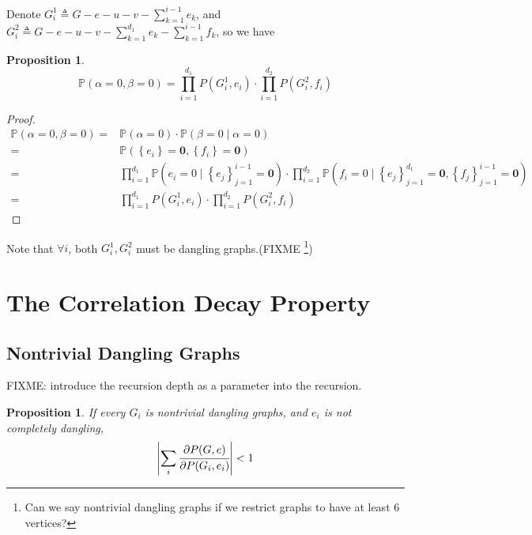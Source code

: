 \documentclass[a4paper]{article}
\newtheorem{Prop}[Thm]{Proposition}
\newcommand{\abs}[1]{\left\vert#1\right\vert}
\newcommand{\set}[1]{\left\{#1\right\}}
\begin{document}
Denote $G_i^1 \triangleq G - e - u - v - \sum_{k=1}^{i-1} e_k$, and $G_i^2 \triangleq G-e-u-v - \sum_{k=1}^{d_1}e_k - \sum_{k=1}^{i-1} f_k$,
so we have

\begin{Prop}
		
	\[\mathbb{P}\left( \alpha = 0, \beta = 0 \right)= \prod_{i=1}^{d_1} P(G_i^1, e_i) \cdot \prod_{i=1}^{d_2} P(G_i^2, f_i) \]

\end{Prop}

\begin{proof}
	\begin{align*}
		\mathbb{P}\left( \alpha = 0, \beta = 0 \right) =& \mathbb{P} \left( \alpha = 0 \right) \cdot \mathbb{P}\left( \beta = 0 \mid \alpha = 0 \right) \\
		=& \mathbb{P} \left( \set{e_i} = \mathbf{0}, \set{f_i} = \mathbf{0} \right) \\
=&\prod_{i=1}^{d_1} \mathbb{P} \left( e_i = 0 \mid \set{e_j}_{j=1}^{i-1} = \mathbf{0} \right) \cdot \prod_{i=1}^{d_2} \mathbb{P} \left( f_i = 0 \mid \set{e_j}_{j=1}^{d_1} = \mathbf{0},\set{f_j}_{j=1}^{i-1} = \mathbf{0} \right) \\
=& \prod_{i=1}^{d_1} P(G_i^1, e_i) \cdot \prod_{i=1}^{d_2} P(G_i^2, f_i) 
	\end{align*}
\end{proof}

Note that $\forall i$, both $G_i^1, G_i^2$ must be dangling graphs.(FIXME \footnote{ Can we say nontrivial dangling graphs if we restrict graphs to have at least 6 vertices?})

	\section{The Correlation Decay Property}
	\subsection{Nontrivial Dangling Graphs}
	FIXME: introduce the recursion depth as a parameter into the recursion.

	\begin{Prop}
		If every $G_i$ is nontrivial dangling graphs, and $e_i$ is not completely dangling, 
		\begin{align*}
			\abs{\sum_i \cfrac{\partial P(G,e)}{\partial P(G_i,e_i)}} < 1 
		\end{align*}
	\end{Prop}
\end{document}
